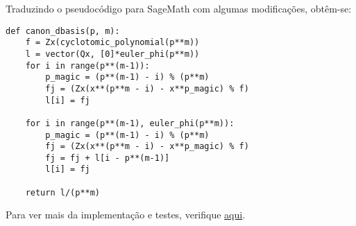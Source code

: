 Traduzindo o pseudocódigo para SageMath com algumas modificações, obtêm-se:

\begin{verbatim}
def canon_dbasis(p, m):
    f = Zx(cyclotomic_polynomial(p**m))
    l = vector(Qx, [0]*euler_phi(p**m))
    for i in range(p**(m-1)):
        p_magic = (p**(m-1) - i) % (p**m)
        fj = (Zx(x**(p**m - i) - x**p_magic) % f)
        l[i] = fj
    
    for i in range(p**(m-1), euler_phi(p**m)):
        p_magic = (p**(m-1) - i) % (p**m)
        fj = (Zx(x**(p**m - i) - x**p_magic) % f)
        fj = fj + l[i - p**(m-1)]
        l[i] = fj
        
    return l/(p**m)
\end{verbatim}

Para ver mais da implementação e testes, verifique \href{https://github.com/gustavoesteche/ic-bootstraping/tree/main/src_sage/dual}{aqui}.